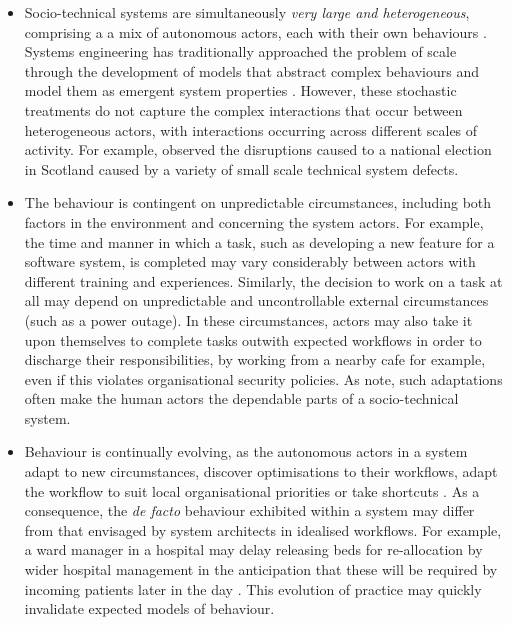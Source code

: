 \documentclass{sig-alternate}
\begin{document}
\begin{itemize}

\item Socio-technical systems are simultaneously \emph{very large and heterogeneous}, comprising a a mix of autonomous
  actors, each with their own behaviours \cite{crabtree00ethnomethodologically}.  Systems engineering has traditionally
  approached the problem of scale through the development of models that abstract complex behaviours and model them as
  emergent system properties \cite{vespignani11model}.  However, these stochastic treatments do not capture the complex
  interactions that occur between heterogeneous actors, with interactions occurring across different scales of activity.
  For example, \citet{lock07observations} observed the disruptions caused to a national election in Scotland caused by a
  variety of small scale technical system defects.

\item The behaviour is contingent on unpredictable circumstances, including both factors in the environment and
  concerning the system actors.  For example, the time and manner in which a task, such as developing a new feature for
  a software system, is completed may vary considerably between actors with different training and experiences.
  Similarly, the decision to work on a task at all may depend on unpredictable and uncontrollable external circumstances
  (such as a power outage).  In these circumstances, actors may also take it upon themselves to complete tasks outwith
  expected workflows in order to discharge their responsibilities, by working from a nearby cafe for example, even if
  this violates organisational security policies.  As \citet{besnard03human} note, such adaptations often make the human
  actors the dependable parts of a socio-technical system.

\item Behaviour is continually evolving, as the autonomous actors in a system adapt to new circumstances, discover
  optimisations to their workflows, adapt the workflow to suit local organisational priorities or take shortcuts
  \citep{bonen79evolutionary,Lyytinen2008,anderson04heterogeneous}.  As a consequence, the \emph{de facto} behaviour
  exhibited within a system may differ from that envisaged by system architects in idealised workflows.  For example, a
  ward manager in a hospital may delay releasing beds for re-allocation by wider hospital management in the anticipation
  that these will be required by incoming patients later in the day \citep{dewsbury07responsibility}.  This evolution of
  practice may quickly invalidate expected models of behaviour.

\end{itemize}
\end{document}
